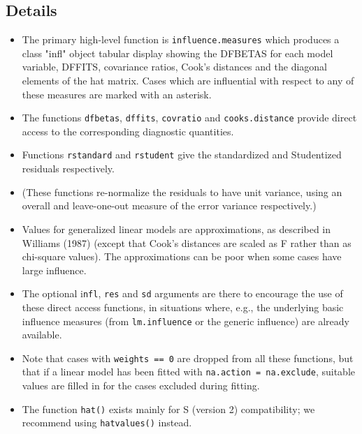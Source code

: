 \documentclass[residuals.tex]{subfiles}
\begin{document}
\subsection*{Details}
\begin{itemize}
\item The primary high-level function is \texttt{influence.measures} which produces a class "infl" object tabular display showing the DFBETAS for each model variable, DFFITS, covariance ratios, Cook's distances and the diagonal elements of the hat matrix. Cases which are influential with respect to any of these measures are marked with an asterisk. 

\item The functions \texttt{dfbetas}, \texttt{dffits}, \texttt{covratio} and \texttt{cooks.distance} provide direct access to the corresponding diagnostic quantities. 

\item Functions \texttt{rstandard} and \texttt{rstudent} give the standardized and Studentized residuals respectively. 

\item (These functions re-normalize the residuals to have unit variance, using an overall and leave-one-out measure of the error variance respectively.) 

\item Values for generalized linear models are approximations, as described in Williams (1987) (except that Cook's distances are scaled as F rather than as chi-square values). The approximations can be poor when some cases have large influence. 

\item The optional i\texttt{nfl}, \texttt{res} and \texttt{sd} arguments are there to encourage the use of these direct access functions, in situations where, e.g., the underlying basic influence measures (from \texttt{lm.influence} or the generic influence) are already available. 

\item Note that cases with \texttt{weights == 0} are dropped from all these functions, but that if a linear model has been fitted with \texttt{na.action = na.exclude}, suitable values are filled in for the cases excluded during fitting. 

\item 
The function \texttt{hat()} exists mainly for S (version 2) compatibility; we recommend using \texttt{hatvalues()} instead. 
\end{itemize}
\end{document}
